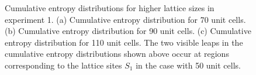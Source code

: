 \documentclass[fleqn,10pt]{wlscirep}
\begin{document}
\begin{figure}
\centering
{}
\caption{Cumulative entropy distributions for higher lattice sizes in experiment 1. (a) Cumulative entropy distribution for 70 unit cells. (b) Cumulative entropy distribution for 90 unit cells. (c) Cumulative entropy distribution for 110 unit cells. The two visible leaps in the cumulative entropy distributions shown above occur at regions corresponding to the lattice sites $S_1$ in the case with 50 unit cells.}
\label{cdf1}
\end{figure}
\end{document}
